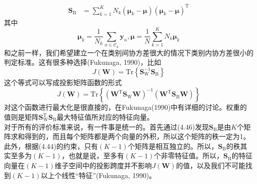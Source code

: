 \documentclass[b5paper]{book}
\numberwithin{equation}{chapter}
\newcommand {\rmT} {\mathrm{T}}
\newcommand {\bfMu} {\boldsymbol{\mu}}
\begin{document}
{\begin{align}
		\mathbf{S}_\mathrm{B} &= \sum_{k=1}^K N_k(\bfMu_k - \bfMu)(\bfMu_k - \bfMu)^{\rmT}
	\end{align}
	其中
	\begin{equation}
		\bfMu_k = \frac{1}{N_k}\sum_{n \in \mathcal{C}_k}\mathbf{y}_n, \bfMu = \frac{1}{N}\sum_{k=1}^K N_k \bfMu_k
	\end{equation}
	和之前一样，我们希望建立一个在类别间协方差很大的情况下类别内协方差很小的判定标准。这有很多种选择(Fukunaga, 1990)，比如
	\begin{equation}
		J(\mathbf{W})=\mathrm{Tr}\left\{\mathbf{S}_\mathrm{W}^{-1} \mathbf{S}_\mathrm{B}\right\}
	\end{equation}
	这个等式可以写成投影矩阵函数的形式
	\begin{equation}
		J(\mathbf{W}) = \mathrm{Tr}\left\{(\mathbf{W}^{\rmT}\mathbf{S}_{\mathrm{W}}\mathbf{W})^{-1}(\mathbf{W}^{\rmT}\mathbf{S}_\mathrm{B}\mathbf{W})\right\}
	\end{equation}
	对这个函数进行最大化是很直接的，在Fukunaga(1990)中有详细的讨论。权重的值则是矩阵$\mathbf{S}_{\mathrm{W}}^{\rmT} \mathbf{S}_\mathrm{B}$最大特征值所对应的特征向量。\\
	\indent 对于所有的评价标准来说，有一件事是统一的。首先通过(4.46)发现$\mathbf{S}_\mathrm{B}$是由$K$个矩阵求和得到的，而且每个矩阵都是两个向量的外积，所以这个矩阵的秩一定为1。此外，根据(4.44)的约束，只有$(K-1)$个矩阵是相互独立的。所以，$\mathbf{S}_\mathrm{B}$的秩其实至多为$(K-1)$，也就是说，至多有$(K-1)$个非零特征值。所以，$\mathbf{S}_\mathrm{B}$的特征向量在$(K-1)$维子空间中的投影跨度并不影响$J(\mathbf{W})$的值，以及我们不可能找到$(K-1)$以上个线性“特征”(Fukunaga, 1990)。
	}
\end{document}
